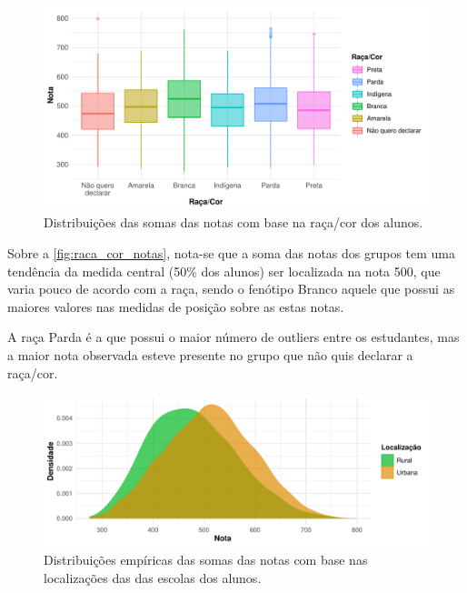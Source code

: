 \begin{figure}[h]
    \caption{Distribuições das somas das notas com base na raça/cor dos alunos.\label{fig:raca_cor_notas}}
    \begin{center}
        \includegraphics[width=16cm]{img/raca_cor_notas.pdf}
    \end{center}
\end{figure}
Sobre a \autoref{fig:raca_cor_notas}, nota-se que a soma das notas dos grupos tem uma
tendência da medida central (50\% dos alunos) ser localizada na nota 500, que varia pouco de 
acordo com a raça, sendo o fenótipo Branco aquele que possui as maiores valores nas medidas
de posição sobre as estas notas.

A raça Parda é a que possui o maior número de outliers entre os estudantes,
mas a maior nota observada esteve presente no grupo que não quis declarar a raça/cor.

\newpage

\begin{figure}[htb]
    \caption{Distribuições empíricas das somas das notas com base nas localizações das
    das escolas dos alunos.\label{img:loc_notas}}
    \begin{center}
        \includegraphics[width=16cm]{img/loc_notas.pdf}
    \end{center}
\end{figure}

